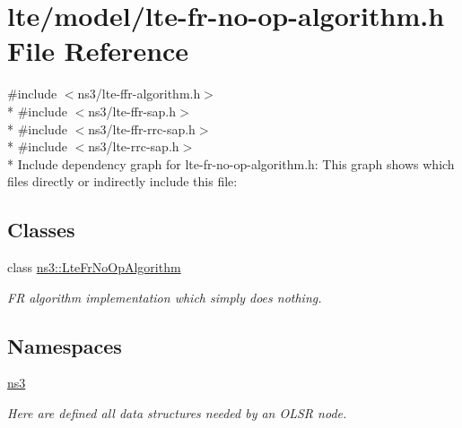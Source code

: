 \hypertarget{lte-fr-no-op-algorithm_8h}{}\section{lte/model/lte-\/fr-\/no-\/op-\/algorithm.h File Reference}
\label{lte-fr-no-op-algorithm_8h}
{\ttfamily \#include $<$ns3/lte-\/ffr-\/algorithm.\+h$>$}\\*
{\ttfamily \#include $<$ns3/lte-\/ffr-\/sap.\+h$>$}\\*
{\ttfamily \#include $<$ns3/lte-\/ffr-\/rrc-\/sap.\+h$>$}\\*
{\ttfamily \#include $<$ns3/lte-\/rrc-\/sap.\+h$>$}\\*
Include dependency graph for lte-\/fr-\/no-\/op-\/algorithm.h\+:
This graph shows which files directly or indirectly include this file\+:
\subsection*{Classes}
\begin{DoxyCompactItemize}
\item 
class \hyperlink{classns3_1_1LteFrNoOpAlgorithm}{ns3\+::\+Lte\+Fr\+No\+Op\+Algorithm}
\begin{DoxyCompactList}\small\item\em FR algorithm implementation which simply does nothing. \end{DoxyCompactList}\end{DoxyCompactItemize}
\subsection*{Namespaces}
\begin{DoxyCompactItemize}
\item 
 \hyperlink{namespacens3}{ns3}
\begin{DoxyCompactList}\small\item\em Here are defined all data structures needed by an O\+L\+SR node. \end{DoxyCompactList}\end{DoxyCompactItemize}
